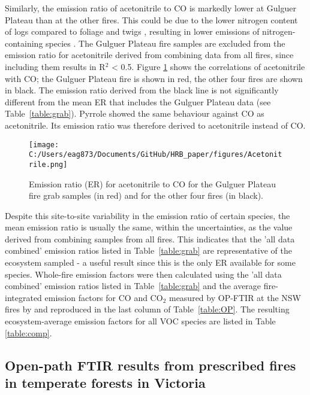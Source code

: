 \documentclass[acp, manuscript]{copernicus}
\begin{document}
Similarly, the emission ratio of acetonitrile to CO is markedly lower at Gulguer Plateau than at the other fires. This could be due to the lower nitrogen content of logs compared to foliage and twigs \citep{Susott1996,Snowdon2005}, resulting in lower emissions of nitrogen-containing species \citep{Coggon2016}. %
The Gulguer Plateau fire samples are excluded from the emission ratio for acetonitrile derived from combining data from all fires, since including them results in R$^2$ < 0.5. Figure \ref{fig:Acetonitrile} shows the correlations of acetonitrile with CO; the Gulguer Plateau fire is shown in red, the other four fires are shown in black. The emission ratio derived from the black line is not significantly different from the mean ER that includes the Gulguer Plateau data (see Table~\ref{table:grab}). 
Pyrrole showed the same behaviour against CO as acetonitrile. Its emission ratio was therefore derived to acetonitrile instead of CO.  

\begin{figure}
  \texttt{[image: C:/Users/eag873/Documents/GitHub/HRB\_paper/figures/Acetonitrile.png]}
  \caption{Emission ratio (ER) for acetonitrile to CO for the Gulguer Plateau fire grab samples (in red) and for the other four fires (in black).}
  \label{fig:Acetonitrile}
\end{figure}

Despite this site-to-site variability in the emission ratio of certain species, the mean emission ratio is usually the same, within the uncertainties, as the value derived from combining samples from all fires. 
This indicates that the 'all data combined' emission ratios listed in Table~\ref{table:grab} are representative of the ecosystem sampled - a useful result since this is the only ER available for some species. 
Whole-fire emission factors were then calculated using the 'all data combined' emission ratios listed in Table~\ref{table:grab} and the average fire-integrated emission factors for CO and CO$_2$ measured by OP-FTIR at the NSW fires by \citet{Paton-Walsh2014} and reproduced in the last column of Table~\ref{table:OP}. The resulting ecosystem-average emission factors for all VOC species are listed in Table \ref{table:comp}.  


\subsection{Open-path FTIR results from prescribed fires in temperate forests in Victoria }
\end{document}

